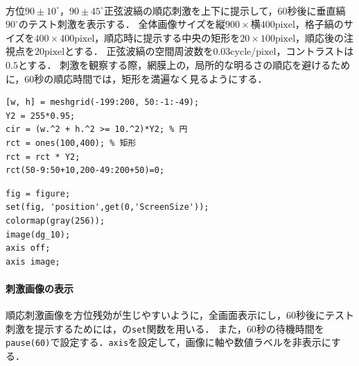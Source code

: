 \paragraph{\kadaicb}
方位\(90\pm 10^\circ\)，\(90\pm 45^\circ\)正弦波縞の順応刺激を上下に提示して，\(60\)秒後に垂直縞\(90^\circ\)のテスト刺激を表示する．
全体画像サイズを\(\textrm{縦}900\times\textrm{横}400\textrm{pixel}\)，格子縞のサイズを\(400\times 400\textrm{pixel}\)，順応時に提示する中央の矩形を\(20\times 100\textrm{pixel}\)，順応後の注視点を\(20\textrm{pixel}\)とする．
正弦波縞の空間周波数を\(0.03\textrm{cycle}/\textrm{pixel}\)，コントラストは\(0.5\)とする．
刺激を観察する際，網膜上の，局所的な明るさの順応を避けるために，\(60\)秒の順応時間では，矩形を満遍なく見るようにする．
\begin{center}
    \begin{minipage}[t]{.48\textwidth}
        \begin{lstlisting}[caption={矩形と円の作成},label={src:矩形と円の作成}]
[w, h] = meshgrid(-199:200, 50:-1:-49);
Y2 = 255*0.95;
cir = (w.^2 + h.^2 >= 10.^2)*Y2; % 円
rct = ones(100,400); % 矩形
rct = rct * Y2;
rct(50-9:50+10,200-49:200+50)=0;
        \end{lstlisting}
    \end{minipage}
    \hspace{.5em}
    \begin{minipage}[t]{.48\textwidth}
        \begin{lstlisting}[caption={刺激画像の表示方法},label={src:刺激画像の表示方法}]
fig = figure;
set(fig, 'position',get(0,'ScreenSize'));
colormap(gray(256));
image(dg_10);
axis off;
axis image;    
    \end{lstlisting}
    \end{minipage}
    \vspace{-.5em}
\end{center}
\newpage
\paragraph{刺激画像の表示}
順応刺激画像を方位残効が生じやすいように，全画面表示にし，\(60\)秒後にテスト刺激を提示するためには，\matlab の\texttt{set}関数を用いる．
また，\(60\)秒の待機時間を\texttt{pause(60)}で設定する．\texttt{axis}を設定して，画像に軸や数値ラベルを非表示にする．
